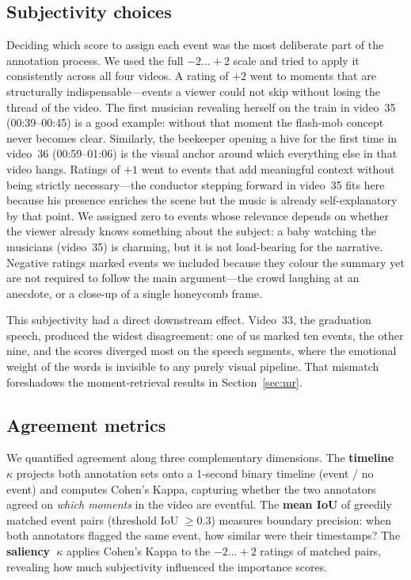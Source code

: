 \documentclass[sigconf, nonacm]{acmart}
\begin{document}
\subsection*{Subjectivity choices}

Deciding which score to assign each event was the most deliberate part of
the annotation process. We used the full $-2\ldots+2$ scale and tried to
apply it consistently across all four videos. A rating of $+2$ went to
moments that are structurally indispensable---events a viewer could not
skip without losing the thread of the video. The first musician revealing
herself on the train in video~35 (00:39--00:45) is a good example: without
that moment the flash-mob concept never becomes clear. Similarly, the
beekeeper opening a hive for the first time in video~36 (00:59--01:06) is
the visual anchor around which everything else in that video hangs. Ratings
of $+1$ went to events that add meaningful context without being strictly
necessary---the conductor stepping forward in video~35 fits here because his
presence enriches the scene but the music is already self-explanatory by
that point. We assigned zero to events whose relevance depends on whether
the viewer already knows something about the subject: a baby watching the
musicians (video~35) is charming, but it is not load-bearing for the
narrative. Negative ratings marked events we included because they colour
the summary yet are not required to follow the main argument---the crowd
laughing at an anecdote, or a close-up of a single honeycomb frame.

This subjectivity had a direct downstream effect. Video~33, the
graduation speech, produced the widest disagreement: one of us marked ten
events, the other nine, and the scores diverged most on the speech
segments, where the emotional weight of the words is invisible to any
purely visual pipeline. That mismatch foreshadows the moment-retrieval
results in Section~\ref{sec:mr}.

\subsection*{Agreement metrics}

We quantified agreement along three complementary dimensions. The
\textbf{timeline~$\kappa$} projects both annotation sets onto a 1-second
binary timeline (event / no event) and computes Cohen's Kappa, capturing
whether the two annotators agreed on \emph{which moments} in the video
are eventful. The \textbf{mean IoU} of greedily matched event pairs
(threshold IoU $\geq 0.3$) measures boundary precision: when both
annotators flagged the same event, how similar were their timestamps?
The \textbf{saliency~$\kappa$} applies Cohen's Kappa to the $-2\ldots+2$
ratings of matched pairs, revealing how much subjectivity influenced the
importance scores.
\end{document}
